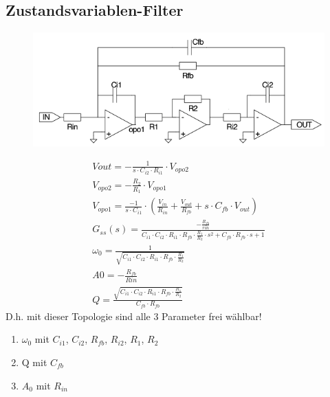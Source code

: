 \subsection{Zustandsvariablen-Filter}
\begin{figure}[!h]
\centering
 \includegraphics[scale=0.5]{pictures/zustandsvariable}
\end{figure}
\begin{gather}
V{out}=-\frac{1}{s\cdot C_{i2}\cdot R_{i1}}\cdot V_{opo2}\\
V_{opo2}=-\frac{R_2}{R_1}\cdot V_{opo1}\\
V_{opo1}=\frac{-1}{s\cdot C_{i1}}\cdot (\frac{V_{in}}{R_{in}}+\frac{V_{out}}{R_{fb}}+s\cdot C_{fb}\cdot V_{out})\\
G_{ss}(s)=\frac{-\frac{R_{fb}}{rin}}{C_{i1}\cdot C_{i2}\cdot R_{i1}\cdot R_{fb}\cdot \frac{R_1}{R_2}\cdot s^2+C_{fb}\cdot R_{fb}\cdot s+1}\\
\omega_{0}=\frac{1}{\sqrt{C_{i1}\cdot C_{i2}\cdot R_{i1}\cdot R_{fb}\cdot \frac{R_1}{R_2}}}\\
A0=-\frac{R_{fb}}{Rin}\\
Q=\frac{\sqrt{C_{i1}\cdot C_{i2}\cdot R_{i1}\cdot R_{fb}\cdot \frac{R_1}{R_2}}}{C_{fb}\cdot R_{fb}}
\end{gather}
D.h. mit dieser Topologie sind alle 3 Parameter frei wählbar!
\begin{enumerate}
  \item $\omega_{0}$ mit $C_{i1}$, $C_{i2}$, $R_{fb}$, $R_{i2}$, $R_1$, $R_2$
  \item Q mit $C_{fb}$
  \item $A_0$ mit $R_{in}$
\end{enumerate}


